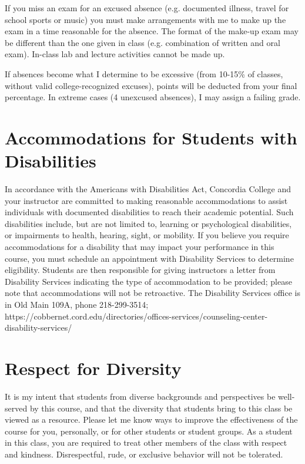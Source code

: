 \documentclass{tufte-handout}
\begin{document}
\begin{fullwidth}
If you miss an exam for an excused absence (e.g. documented illness, travel for school sports or music) you must make arrangements with me to make up the exam in a time reasonable for the absence. The format of the make-up exam may be different than the one given in class (e.g. combination of written and oral exam). In-class lab and lecture activities cannot be made up.

If absences become what I determine to be excessive (from 10-15\% of classes, without valid college-recognized excuses), points will be deducted from your final percentage. In extreme cases (4 unexcused absences), I may assign a failing grade. 

\section{Accommodations for Students with Disabilities}

In accordance with the Americans with Disabilities Act, Concordia College and your instructor are committed to making reasonable accommodations to assist individuals with documented disabilities to reach their academic potential. Such disabilities include, but are not limited to, learning or psychological disabilities, or impairments to health, hearing, sight, or mobility. If you believe you require accommodations for a disability that may impact your performance in this course, you must schedule an appointment with Disability Services to determine eligibility. Students are then responsible for giving instructors a letter from Disability Services indicating the type of accommodation to be provided; please note that accommodations will not be retroactive. The Disability Services office is in Old Main 109A, phone 218-299-3514; https://cobbernet.cord.edu/directories/offices-services/counseling-center-disability-services/

\section{Respect for Diversity}

It is my intent that students from diverse backgrounds and perspectives be well-served by this course, and that the diversity that students bring to this class be viewed as a resource. Please let me know ways to improve the effectiveness of the course for you, personally, or for other students or student groups. As a student in this class, you are required to treat other members of the class with respect and kindness. Disrespectful, rude, or exclusive behavior will not be tolerated.

\end{fullwidth}
\end{document}
